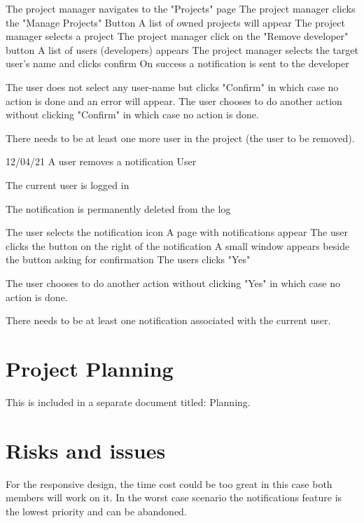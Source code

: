 \documentclass[10pt,a4paper]{article}
\begin{document}
{\begin{itemize}
	\q The project manager navigates to the "Projects" page
	\q The project manager clicks the "Manage Projects" Button
	\q A list of owned projects will appear
	\q The project manager selects a project
	\q The project manager click on the "Remove developer" button
	\q A list of users (developers) appears
	\q The project manager selects the target user's name and clicks confirm
	\q On success a notification is sent to the developer
\end{itemize}}
{\begin{itemize}
	\q The user does not select any user-name but clicks "Confirm" in which case no action is done and an error will appear.
	\q The user chooses to do another action without clicking "Confirm" in which case no action is done.
\end{itemize}}
{\begin{itemize}
	\q There needs to be at least one more user in the project (the user to be removed).
\end{itemize}}
\newp{}
{12/04/21}
{A user removes a notification}
{User}
{\begin{itemize}
	\q The current user is logged in
\end{itemize}}
{\begin{itemize}
	\q The notification is permanently deleted from the log
\end{itemize}}
{\begin{itemize}
	\q The user selects the notification icon
	\q A page with notifications appear
	\q The user clicks the button on the right of the notification
	\q A small window appears beside the button asking for confirmation
	\q The users clicks "Yes"
\end{itemize}}
{\begin{itemize}
	\q The user chooses to do another action without clicking "Yes" in which case no action is done.
\end{itemize}}
{\begin{itemize}
	\q There needs to be at least one notification associated with the current user.
\end{itemize}}

\newpage
\section{Project Planning}
\p This is included in a separate document titled: Planning.

\section{Risks and issues}
\p For the responsive design, the time cost could be too great in this case both members will work on it.
\p In the worst case scenario the notifications feature is the lowest priority and can be abandoned.
\end{document}
